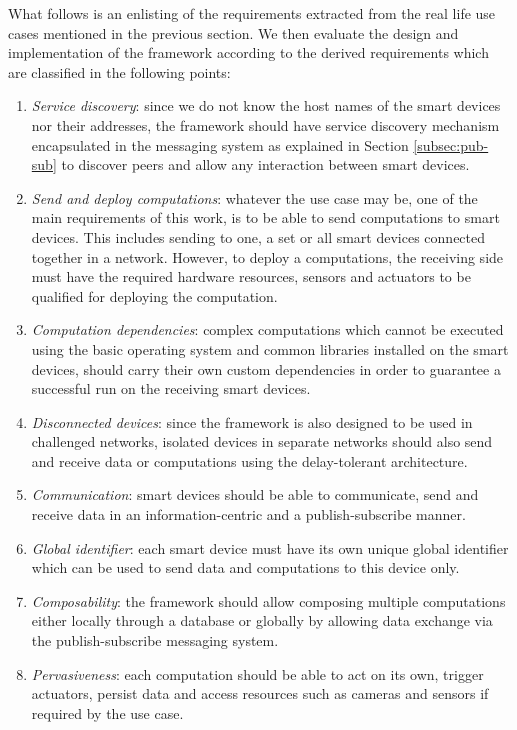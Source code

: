 What follows is an enlisting of  the requirements extracted from the real life use cases mentioned in the previous section. We then  evaluate the design and implementation of the framework according to the derived requirements which are  classified  in the following points:
\begin{enumerate}
\item \textit{Service discovery}: since we do not know the host names of the smart devices nor their addresses, the framework should have service discovery mechanism encapsulated in the messaging system as explained in Section \ref{subsec:pub-sub}  to discover peers and  allow any interaction between smart devices.
		
\item \textit{Send and deploy computations}: whatever the use case may be, one of the main requirements of this work, is to be able to send computations to smart devices. This includes sending to one, a set or all smart devices connected together in a network. However, to deploy a computations, the receiving side must have the required hardware resources, sensors and actuators to be qualified for deploying the computation.
 
 \item \textit{Computation dependencies}: complex computations which cannot be executed using the basic operating system and common libraries installed on the smart devices, should carry their  own custom dependencies in order to guarantee a successful run on the receiving smart devices. 


\item \textit{Disconnected devices}: since the framework is also designed to be used in challenged networks, isolated devices in separate networks should also send and receive data or computations using the delay-tolerant architecture.


\item \textit{Communication}: smart devices should be able to communicate, send and receive data in an information-centric and a publish-subscribe manner.

\item \textit{Global identifier}: each smart device must have its own unique global identifier which can be used to send data and computations to this device only.

\item \textit{Composability}: the framework should allow composing multiple computations either locally through a database or globally by allowing data exchange via the publish-subscribe messaging system.

\item \textit{Pervasiveness}: each computation should be able to act on its own, trigger actuators, persist data and access resources such as cameras and sensors if required by the use case.
\end{enumerate}


